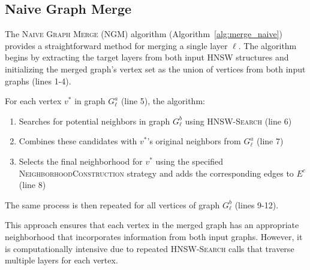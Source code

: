 \documentclass{article}
\begin{document}
\subsection{Naive Graph Merge}
The \textsc{Naive Graph Merge} (\textsc{NGM}) algorithm (Algorithm~\ref{alg:merge_naive}) provides a straightforward method for merging a single layer $\ell$. The algorithm begins by extracting the target layers from both input HNSW structures and initializing the merged graph's vertex set as the union of vertices from both input graphs (lines 1-4).

For each vertex $v^*$ in graph $G^a_\ell$ (line 5), the algorithm:
\begin{enumerate}
  \item Searches for potential neighbors in graph $G^b_\ell$ using \textsc{HNSW-Search} (line 6)
  \item Combines these candidates with $v^*$'s original neighbors from $G^a_\ell$ (line 7)
  \item Selects the final neighborhood for $v^*$ using the specified \textsc{NeighborhoodConstruction} strategy and adds the corresponding edges to $E^c$ (line 8)
\end{enumerate}

The same process is then repeated for all vertices of graph $G^b_\ell$ (lines 9-12).

This approach ensures that each vertex in the merged graph has an appropriate neighborhood that incorporates information from both input graphs. However, it is computationally intensive due to repeated \textsc{HNSW-Search} calls that traverse multiple layers for each vertex.
\end{document}
